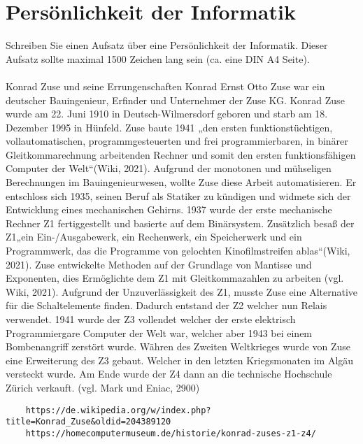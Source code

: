 \section{Persönlichkeit der Informatik}
Schreiben Sie einen Aufsatz über eine Persönlichkeit der Informatik. Dieser Aufsatz sollte maximal 1500 Zeichen lang sein (ca. eine DIN A4 Seite).\\
\\
Konrad Zuse und seine Errungenschaften
Konrad Ernst Otto Zuse war ein deutscher Bauingenieur, Erfinder und Unternehmer der Zuse KG. Konrad Zuse wurde am 22. Juni 1910 in Deutsch-Wilmersdorf geboren und starb am 18. Dezember 1995 in Hünfeld. Zuse baute 1941 „den ersten funktionstüchtigen, vollautomatischen, programmgesteuerten und frei programmierbaren, in binärer Gleitkommarechnung arbeitenden Rechner und somit den ersten funktionsfähigen Computer der Welt“(Wiki, 2021).
Aufgrund der monotonen und mühseligen Berechnungen im Bauingenieurwesen, wollte Zuse diese Arbeit automatisieren. Er entschloss sich 1935, seinen Beruf als Statiker zu kündigen und widmete sich der Entwicklung eines mechanischen Gehirns. 1937 wurde der erste mechanische Rechner Z1 fertiggestellt und basierte auf dem Binärsystem. Zusätzlich besaß der Z1„ein Ein-/Ausgabewerk, ein Rechenwerk, ein Speicherwerk und ein Programmwerk, das die Programme von gelochten Kinofilmstreifen ablas“(Wiki, 2021). Zuse entwickelte Methoden auf der Grundlage von Mantisse und Exponenten, dies Ermöglichte dem Z1 mit Gleitkommazahlen zu arbeiten (vgl. Wiki, 2021). Aufgrund der Unzuverlässigkeit des Z1, musste Zuse eine Alternative für die Schaltelemente finden.  Dadurch entstand der Z2 welcher nun Relais verwendet. 1941 wurde der Z3 vollendet welcher der erste elektrisch Programmiergare Computer der Welt war, welcher aber 1943 bei einem Bombenangriff zerstört wurde. Währen des Zweiten Weltkrieges wurde von Zuse eine Erweiterung des Z3 gebaut. Welcher in den letzten Kriegsmonaten im Algäu versteckt wurde. Am Ende wurde der Z4 dann an die technische Hochschule Zürich verkauft. (vgl. Mark und Eniac, 2900)

\begin{lstlisting}
	https://de.wikipedia.org/w/index.php?title=Konrad_Zuse&oldid=204389120
	https://homecomputermuseum.de/historie/konrad-zuses-z1-z4/
\end{lstlisting}